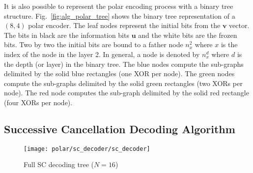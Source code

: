 It is also possible to represent the polar encoding process with a binary tree
structure. Fig.~\ref{fig:alg_polar_tree} shows the binary tree representation of
a $(8,4)$ polar encoder. The leaf nodes represent the initial bits from the
$\bm{v}$ vector. The bits in black are the information bits $\bm{u}$ and the
white bits are the frozen bits. Two by two the initial bits are bound to a
father node $n_x^2$ where $x$ is the index of the node in the layer 2. In
general, a node is denoted by $n_x^d$ where $d$ is the depth (or layer) in the
binary tree. The {\color{Paired-1} blue} nodes compute the sub-graphs delimited
by the solid {\color{Paired-1} blue} rectangles (one XOR per node). The
{\color{Paired-3} green} nodes compute the sub-graphs delimited by the solid
{\color{Paired-3} green} rectangles (two XORs per node). The {\color{Paired-5}
red} node computes the sub-graph delimited by the solid {\color{Paired-5} red}
rectangle (four XORs per node).

\subsection{Successive Cancellation Decoding Algorithm}

\begin{figure}[htp]
  \centering
  \texttt{[image: polar/sc\_decoder/sc\_decoder]}
  \caption{Full SC decoding tree ($N = 16$)}
  \label{fig:polar_sc_decoder}
\end{figure}

